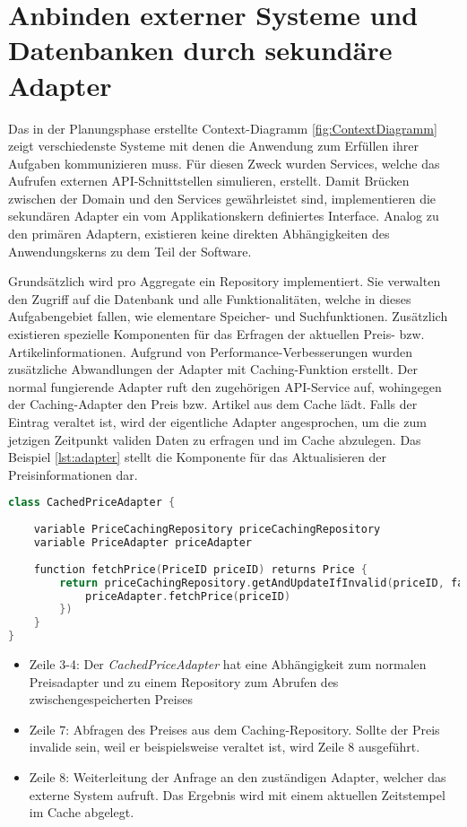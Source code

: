 \pagebreak

\section{Anbinden externer Systeme und Datenbanken durch sekundäre Adapter}

Das in der Planungsphase erstellte Context-Diagramm \ref{fig:ContextDiagramm} zeigt verschiedenste Systeme mit denen die Anwendung zum Erfüllen ihrer Aufgaben kommunizieren muss. Für diesen Zweck wurden Services, welche das Aufrufen externen API-Schnittstellen simulieren, erstellt. Damit Brücken zwischen der Domain und den Services gewährleistet sind, implementieren die sekundären Adapter ein vom Applikationskern definiertes Interface. Analog zu den primären Adaptern, existieren keine direkten Abhängigkeiten des Anwendungskerns zu dem Teil der Software.

Grundsätzlich wird pro Aggregate ein Repository implementiert. Sie verwalten den Zugriff auf die Datenbank und alle Funktionalitäten, welche in dieses Aufgabengebiet fallen, wie elementare Speicher- und Suchfunktionen. Zusätzlich existieren spezielle Komponenten für das Erfragen der aktuellen Preis- bzw. Artikelinformationen. Aufgrund von Performance-Verbesserungen wurden zusätzliche Abwandlungen der Adapter mit Caching-Funktion erstellt. Der normal fungierende Adapter ruft den zugehörigen API-Service auf, wohingegen der Caching-Adapter den Preis bzw. Artikel aus dem Cache lädt. Falls der Eintrag veraltet ist, wird der eigentliche Adapter angesprochen, um die zum jetzigen Zeitpunkt validen Daten zu erfragen und im Cache abzulegen. Das Beispiel \ref{lst:adapter} stellt die Komponente für das Aktualisieren der Preisinformationen dar. 

\vspace{0,5cm}
\begin{minipage}{\linewidth} %
	\begin{lstlisting}[caption={Preisadapter mit Caching-Funktion}, label={lst:adapter}, language=Kotlin]
class CachedPriceAdapter {
	
	variable PriceCachingRepository priceCachingRepository 
	variable PriceAdapter priceAdapter
	
	function fetchPrice(PriceID priceID) returns Price {
		return priceCachingRepository.getAndUpdateIfInvalid(priceID, fallback = {
			priceAdapter.fetchPrice(priceID)
		})
	}
}
	\end{lstlisting}
	\begin{itemize}
		\setlength\itemsep{-1pt}
		\item Zeile 3-4: Der \emph{CachedPriceAdapter} hat eine Abhängigkeit zum normalen Preisadapter und zu einem Repository zum Abrufen des zwischengespeicherten Preises
		\item Zeile 7: Abfragen des Preises aus dem Caching-Repository. Sollte der Preis invalide sein, weil er beispielsweise veraltet ist, wird Zeile 8 ausgeführt.
		\item Zeile 8: Weiterleitung der Anfrage an den zuständigen Adapter, welcher das externe System aufruft. Das Ergebnis wird mit einem aktuellen Zeitstempel im Cache abgelegt.
	\end{itemize}
\end{minipage}
